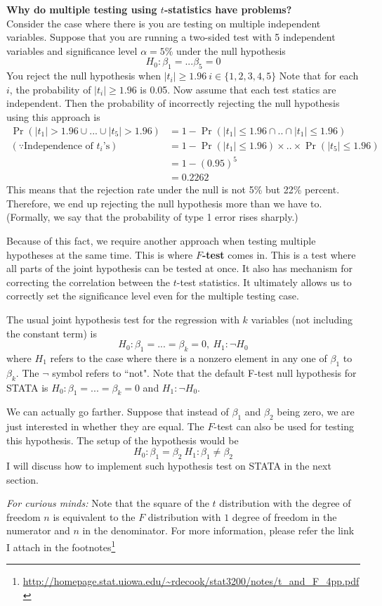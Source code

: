 \begin{mdframed}[backgroundcolor=blue!5] 
\textbf{Why do multiple testing using $t$-statistics have problems?} \medskip \\ 
Consider the case where there is you are testing on multiple independent variables. Suppose that you are running a two-sided test with 5 independent variables and significance level $\alpha = 5\%$ under the null hypothesis
\[
H_0: \beta_1=...\beta_5=0
\]
You reject the null hypothesis when $|t_i|\geq 1.96 \ i\in\{1,2,3,4,5\}$ Note that for each $i$, the probability of $|t_i|\geq 1.96$ is 0.05. Now assume that each test statics are independent. Then the probability of incorrectly rejecting the null hypothesis using this approach is
\[
\begin{aligned}
\Pr(|t_1|>1.96 \cup...\cup |t_5|>1.96) & =1-\Pr(|t_1|\leq1.96\cap .. \cap|t_1|\leq1.96)\\
(\because\text{Independence of $t_i$'s}) \ \ &=1-\Pr(|t_1|\leq1.96)\times ..\times\Pr(|t_5|\leq1.96) \\
 & = 1-(0.95)^5 \\
 &= 0.2262
\end{aligned}
\]
This means that the rejection rate under the null is not 5\% but 22\% percent. Therefore, we end up rejecting the null hypothesis more than we have to. (Formally, we say that the probability of type 1 error rises sharply.) 
\end{mdframed} \par\medskip
Because of this fact, we require another approach when testing multiple hypotheses at the same time. This is where \textbf{$F$-test} comes in. This is a test where all parts of the joint hypothesis can be tested at once. It also has mechanism for correcting the correlation between the $t$-test statistics. It ultimately allows us to correctly set the significance level even for the multiple testing case. \par\medskip
The usual joint hypothesis test for the regression with $k$ variables (not including the constant term) is
\[
H_0: \beta_1 = ... =\beta_k=0, \ H_1:\lnot H_0
\]
where $H_1$ refers to the case where there is a nonzero element in any one of $\beta_1$ to $\beta_k$. The $\lnot$ symbol refers to ``not". Note that the default F-test null hypothesis for STATA is $H_0:\beta_1 = ... =\beta_k=0$ and $H_1: \lnot H_0$.\par\medskip
We can actually go farther. Suppose that instead of $\beta_1$ and $\beta_2$ being zero, we are just interested in whether they are equal. The $F$-test can also be used for testing this hypothesis. The setup of the hypothesis would be
\[
H_0: \beta_1 = \beta_2 \ H_1: \beta_1 \neq \beta_2
\]
I will discuss how to implement such hypothesis test on STATA in the next section. \par\medskip
\noindent
\textit{For curious minds: } Note that the square of the $t$ distribution with the degree of freedom $n$ is equivalent to the $F$ distribution with $1$ degree of freedom in the numerator and $n$ in the denominator. For more information, please refer the link I attach in the footnotes\footnote{\url{http://homepage.stat.uiowa.edu/~rdecook/stat3200/notes/t_and_F_4pp.pdf}}
